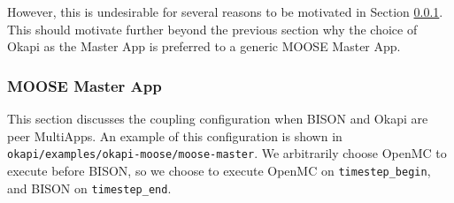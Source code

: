 \documentclass[10pt]{article}
\numberwithin{equation}{section} %
\begin{document}
However, this is undesirable for several reasons to be motivated in Section \ref{sec:MOOSEMaster}. This should motivate further beyond the previous section why the choice of Okapi as the Master App is preferred to a generic MOOSE Master App.

\subsubsection{MOOSE Master App}
\label{sec:MOOSEMaster}
This section discusses the coupling configuration when BISON and Okapi are peer MultiApps. An example of this configuration is shown in {\tt okapi/examples/okapi-moose/moose-master}. We arbitrarily choose OpenMC to execute before BISON, so we choose to execute OpenMC on {\tt timestep\_begin}, and BISON on {\tt timestep\_end}. 
\end{document}
